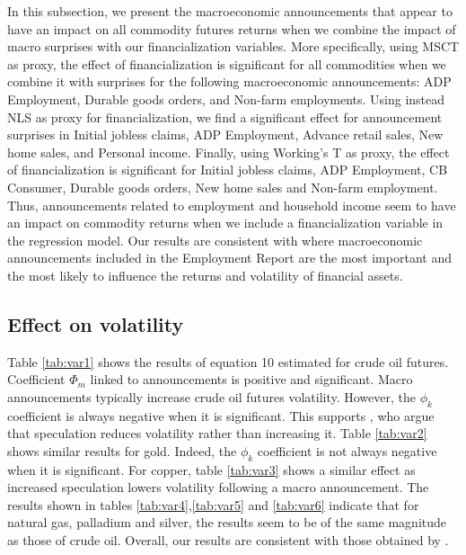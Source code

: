 \documentclass[12pt]{article}
\begin{document}
  In this subsection, we present the macroeconomic announcements that appear to have an impact on all commodity futures returns when we combine the impact of macro  surprises with our financialization variables.  More specifically, using MSCT as proxy, the effect of financialization is significant for all commodities when we combine it with surprises for the following macroeconomic announcements: ADP Employment, Durable goods orders, and Non-farm employments. Using instead NLS as proxy for financialization, we find a significant effect for announcement surprises in Initial jobless claims, ADP Employment, Advance retail sales, New home sales, and Personal income. Finally, using Working's T as proxy, the effect of financialization is significant for  Initial jobless claims, ADP Employment, CB Consumer, Durable goods orders, New home sales and Non-farm employment. Thus,  announcements related to employment and household income seem to have an impact on commodity returns when we include a financialization variable in the regression model. Our results are consistent with \citet{hordahl2015expectations} where macroeconomic announcements included in the Employment Report are the most important and the most likely to influence the returns and  volatility of financial assets.
  
	\subsection{Effect on volatility}
	Table \ref{tab:var1} shows the results of equation 10 estimated for crude oil futures.   Coefficient $\Phi_m$ linked to announcements is positive and significant.  Macro announcements typically increase crude oil futures volatility. However, the $\phi_k$ coefficient  is always negative when it is significant. This supports \citet{brunetti2016speculators}, who argue that speculation reduces volatility rather than increasing it. Table \ref{tab:var2} shows similar results for gold. Indeed, the $\phi_k$  coefficient is not always negative when it is significant. For copper, table \ref{tab:var3} shows a similar effect as increased speculation lowers volatility  following a macro announcement. The results shown in tables \ref{tab:var4},\ref{tab:var5} and \ref{tab:var6} indicate that for natural gas, palladium and silver, the results seem to be of the same magnitude as those of crude oil.  Overall, our results are consistent with those obtained by \citet{brunetti2016speculators}.
	
\end{document}
